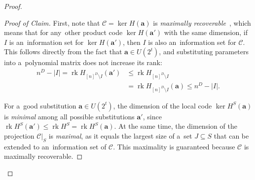 \documentclass[conference]{IEEEtran}
\let\le\leqslant
\theoremstyle{plain}
\theoremstyle{definition}
\theoremstyle{remark}
\newcommand{\va}{\mathbf{a}}
\newcommand{\cC}{\mathcal{C}}
\DeclareMathOperator{\rk}{rk}
\begin{document}
\begin{proof}
\begin{proof}[Proof of Claim]
    First, note that $\cC = \ker H(\va)$ is \emph{maximally recoverable}~\cite{chenMaximallyRecoverableProperty2007, gopalanExplicitMaximallyRecoverable2014}, which means that for any~other product code $\ker H(\va')$ with the same dimension, if $I$ is an~information set for $\ker H(\va')$, then $I$ is also an~information set for $\cC$. This follows directly from the fact that $\va \in U(2^t)$, and substituting parameters into a~polynomial matrix does not increase its rank:
    \begin{align*}
    n^D - |I| = \rk H_{[n]^D \setminus I}(\va') 
    &\le \rk H_{[n]^D \setminus I}\\ 
    &= \rk H_{[n]^D \setminus I}(\va) \le n^D - |I|.
    \end{align*}
    
    For a~good substitution $\va \in U(2^t)$, the dimension of the local code $\ker H^S(\va)$ is \emph{minimal} among all possible substitutions $\va'$, since $\rk H^S(\va') \le \rk H^S = \rk H^S(\va)$. At the same time, the dimension of the projection $\cC|_S$ is \emph{maximal}, as it equals the largest size of a~set $J \subseteq S$ that can be extended to an~information set of $\cC$. This maximality is guaranteed because $\cC$ is maximally recoverable.
    

\end{proof}
\end{proof}
\end{document}
